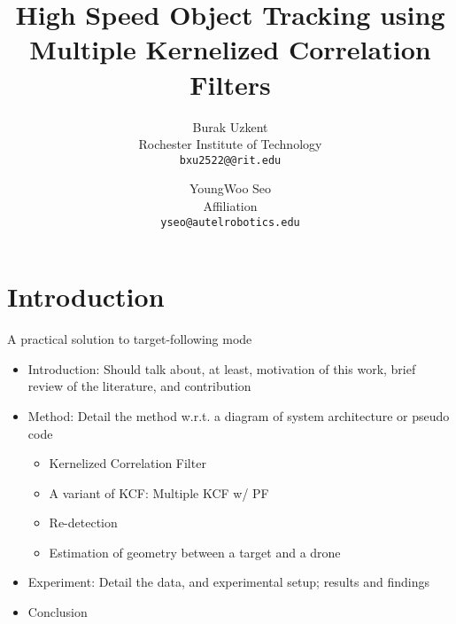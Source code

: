 \documentclass[10pt,twocolumn,letterpaper]{article}
\begin{document}
\title{High Speed Object Tracking using Multiple Kernelized Correlation Filters}

\author{Burak Uzkent\\
Rochester Institute of Technology\\
{\tt\small bxu2522@@rit.edu}
\and
YoungWoo Seo\\
Affiliation\\
{\tt\small yseo@autelrobotics.edu}
}

\maketitle

\begin{abstract}

\end{abstract}

\section{Introduction}

A practical solution to target-following mode

\begin{itemize}
\item Introduction: Should talk about, at least, motivation of this
  work, brief review of the literature, and contribution
\item Method: Detail the method w.r.t. a diagram of system
  architecture or pseudo code
\begin{itemize}
\item Kernelized Correlation Filter
\item A variant of KCF: Multiple KCF w/ PF
\item Re-detection
\item Estimation of geometry between a target and a drone
\end{itemize}
\item Experiment: Detail the data, and experimental setup; results and findings
\item Conclusion
\end{itemize}
\end{document}
